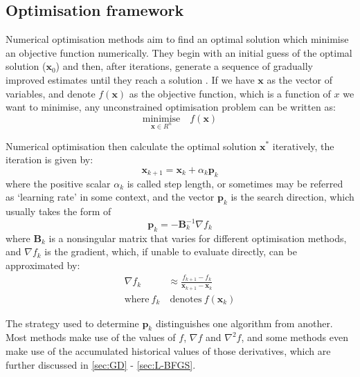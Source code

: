 \subsection{Optimisation framework} \label{sec:Optimisation framework}
Numerical optimisation methods aim to find an optimal solution which minimise an objective function numerically. They begin with an initial guess of the optimal solution ($\textbf{x}_{0}$) and then, after iterations, generate a sequence of gradually improved estimates until they reach a solution \cite{Nocedal2006}. If we have $\textbf{x}$ as the vector of variables, and denote $f(\textbf{x})$ as the objective function, which is a function of $x$ we want to minimise, any unconstrained optimisation problem can be written as:
\begin{equation}
  \underset{\textbf{x}\in R^n}{\text{minimise}}\quad f(\textbf{x})
  \label{eq:minimise_F}
\end{equation}

Numerical optimisation then calculate the optimal solution $\textbf{x}^*$ iteratively, the iteration is given by:
\begin{equation}
  \textbf{x}_{k+1} = \textbf{x}_k+\alpha_k \textbf{p}_k
  \label{eq:optimisation_iteration}
\end{equation}
where the positive scalar $\alpha_k$ is called step length, or sometimes may be referred as `learning rate' in some context, and the vector $\textbf{p}_k$ is the search direction, which usually takes the form of
\begin{equation}
  \textbf{p}_k = -\textbf{B}_k^{-1} \nabla f_{k} \label{eq:general-descent-direction}
\end{equation}
where $\textbf{B}_k$ is a nonsingular matrix that varies for different optimisation methods, and $\nabla f_k$ is the gradient, which, if unable to evaluate directly, can be approximated by:
\begin{align}
  \nabla f_k         & \approx \frac{f_{k+1}-f_{k}}{\textbf{x}_{k+1}-\textbf{x}_{k}} \nonumber \\
  \text{where}\  f_k & \ \text{denotes}\  f(\textbf{x}_k)
\end{align}

The strategy used to determine $\textbf{p}_k$ distinguishes one algorithm from another. Most methods make use of the values of $f$, $\nabla f$ and $\nabla^2 f$, and some methods even make use of the accumulated historical values of those derivatives, which are further discussed in \cref{sec:GD} - \cref{sec:L-BFGS}.

